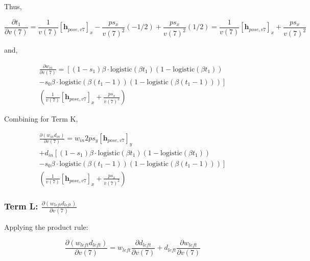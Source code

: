 \documentclass[11pt]{article}
\begin{document}
            Thus,

            \begin{equation}
                \frac{\partial t_1}{\partial v(7)} =  \frac{1}{v(7)}[\mathbf{h}_{pose,v7}]_x -\frac{ps_{x}}{v(7)^2}(-1/2) +   \frac{ps_{x}}{v(7)^2}(1/2) =  \frac{1}{v(7)}[\mathbf{h}_{pose,v7}]_x + \frac{ps_{x}}{v(7)^2}
            \end{equation}

            and,

            \begin{multline}
                \frac{\partial w_{in}}{\partial v(7)} = \left[(1 - s_1)\beta \cdot \text{logistic}(\beta t_1)(1 - \text{logistic}(\beta t_1)) \right. \\
                \left. - s_0\beta \cdot \text{logistic}(\beta (t_1 - 1))(1 - \text{logistic}(\beta (t_1 - 1)))\right] \\
                \left(\frac{1}{v(7)}[\mathbf{h}_{pose,v7}]_x + \frac{ps_{x}}{v(7)^2}\right)
            \end{multline}

            Combining for Term K,

            \begin{multline}
                \frac{\partial (w_{in} d_{in})}{\partial v(7)} =  w_{in}  2 ps_{y} [\mathbf{h}_{pose,v7}]_y  \\
                + d_{in} \left[(1 - s_1)\beta \cdot \text{logistic}(\beta t_1)(1 - \text{logistic}(\beta t_1)) \right. \\
                \left. - s_0\beta \cdot \text{logistic}(\beta (t_1 - 1))(1 - \text{logistic}(\beta (t_1 - 1)))\right] \\
                \left(\frac{1}{v(7)}[\mathbf{h}_{pose,v7}]_x + \frac{ps_{x}}{v(7)^2}\right)
            \end{multline}

            \subsubsection*{Term L: $\frac{\partial (w_{left} d_{left})}{\partial v(7)}$}

                Applying the product rule:

                \begin{equation}
                    \frac{\partial (w_{left} d_{left})}{\partial v(7)} = w_{left} \frac{\partial d_{left}}{\partial v(7)} + d_{left} \frac{\partial w_{left}}{\partial v(7)}
                \end{equation}
\end{document}
